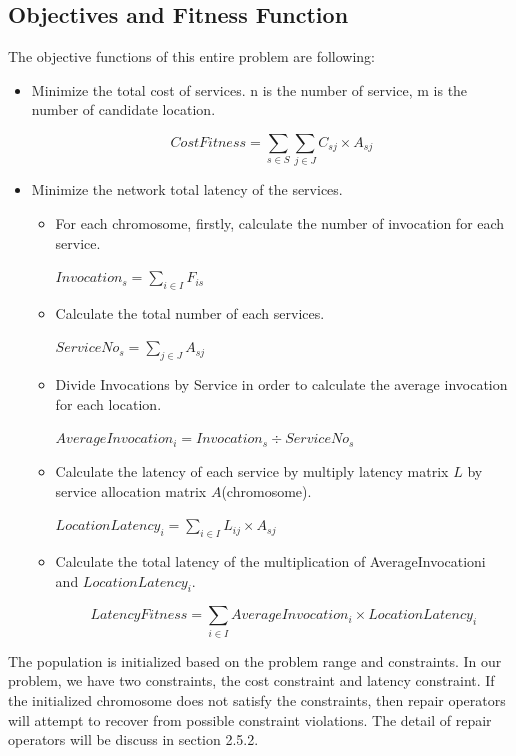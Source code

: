 \documentclass[twoside]{article}
\begin{document}
\subsection{Objectives and Fitness Function}
The objective functions of this entire problem are following:
\begin{itemize}
	\item Minimize the total cost of services. n is the number of service, m is the number of candidate location.
		\begin{center}
			\begin{equation}
				CostFitness = \sum\limits_{s \in S} \sum\limits_{j \in J} C_{sj} \times A_{sj}
			\end{equation}
		\end{center}
	\item Minimize the network total latency of the services.
		\begin{itemize}
			\item For each chromosome, firstly, calculate the number of invocation for each service.
				\begin{center}
					$Invocation_{s} = \sum\limits_{i \in I} F_{is}$
				\end{center}
			\item Calculate the total number of each services.
				\begin{center}
					$ServiceNo_{s} = \sum\limits_{j \in J} A_{sj}$
				\end{center}
			\item Divide Invocations by Service in order to calculate the average invocation for each location.
				\begin{center}
					$AverageInvocation_{i} = Invocation_{s} \div ServiceNo_{s}$
				\end{center}

			\item Calculate the latency of each service by multiply latency matrix $L$ by service allocation matrix $A$(chromosome).
				\begin{center}
					$LocationLatency_{i} = \sum\limits_{i \in I} L_{ij} \times A_{sj}$
				\end{center}

			\item Calculate the total latency of the multiplication of AverageInvocationi and $LocationLatency_{i}$.
				\begin{center}
					\begin{equation}
						LatencyFitness = \sum\limits_{i \in I} AverageInvocation_{i} \times LocationLatency_{i}
					\end{equation}
				\end{center}
		\end{itemize}
\end{itemize}
The population is initialized based on the problem range and constraints. 
In our problem, we have two constraints, the cost constraint and latency constraint. 
If the initialized chromosome does not satisfy the constraints, then repair operators will attempt to 
recover from possible constraint violations. The detail of repair operators will be discuss in section 2.5.2.
\end{document}
